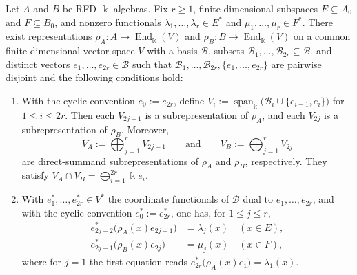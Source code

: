 \begin{lemma}\label{lemma_two_algebra_coefficients_cyclic}
    Let \(A\) and \(B\) be RFD \(\Bbbk\)-algebras. Fix \(r\geq1\), finite-dimensional subspaces \(E\subseteq A_0\) and \(F\subseteq B_0\), and nonzero functionals \(\lambda_1,\ldots,\lambda_r\in E^*\) and \(\mu_1,\ldots,\mu_r\in F^*\). There exist representations \(\rho_A\colon A\to\operatorname{End}_{\Bbbk}(V)\) and \(\rho_B\colon B\to\operatorname{End}_{\Bbbk}(V)\) on a common finite-dimensional vector space \(V\) with a basis \(\mathcal{B}\), subsets \(\mathcal{B}_1,\ldots,\mathcal{B}_{2r}\subseteq\mathcal{B}\), and distinct vectors \(e_1,\ldots,e_{2r}\in\mathcal{B}\) such that
    \(
        \mathcal{B}_1,\ldots,\mathcal{B}_{2r},
        \{e_1,\ldots,e_{2r}\}
    \)
    are pairwise disjoint and the following conditions hold:
    \begin{enumerate}[label=\textup{\arabic*)},leftmargin=5ex]
        \item With the cyclic convention \(e_0:=e_{2r}\), define
        \(
            V_i:=\operatorname{span}_{\Bbbk}
            \bigl(\mathcal{B}_i\cup\{e_{i-1},e_i\}\bigr)
        \)
        for \(1\leq i\leq 2r\). Then each \(V_{2j-1}\) is a subrepresentation of \(\rho_A\), and each \(V_{2j}\) is a subrepresentation of \(\rho_B\). Moreover,
        \[
            V_A:=\bigoplus_{j=1}^{r}V_{2j-1}
            \qquad\text{and}\qquad
            V_B:=\bigoplus_{j=1}^{r}V_{2j}
        \]
        are direct-summand subrepresentations of \(\rho_A\) and \(\rho_B\), respectively. They satisfy
        \(
            V_A\cap V_B=\bigoplus_{i=1}^{2r}\Bbbk e_i.
        \)
        \item With \(e_1^*,\ldots,e_{2r}^*\in V^*\) the coordinate functionals of \(\mathcal{B}\) dual to \(e_1,\ldots,e_{2r}\), and with the cyclic convention \(e_0^*:=e_{2r}^*\), one has, for \(1\leq j\leq r\),
        \begin{equation}\label{f_free_product_cyclic_entries}
            \begin{aligned}
                e_{2j-2}^*\bigl(\rho_A(x)e_{2j-1}\bigr)&=\lambda_j(x)\quad(x\in E),\\
                e_{2j-1}^*\bigl(\rho_B(x)e_{2j}\bigr)&=\mu_j(x)\quad(x\in F),
            \end{aligned}
        \end{equation}
        where for \(j=1\) the first equation reads \(e_{2r}^*\bigl(\rho_A(x)e_1\bigr)=\lambda_1(x)\).
    \end{enumerate}
\end{lemma}

